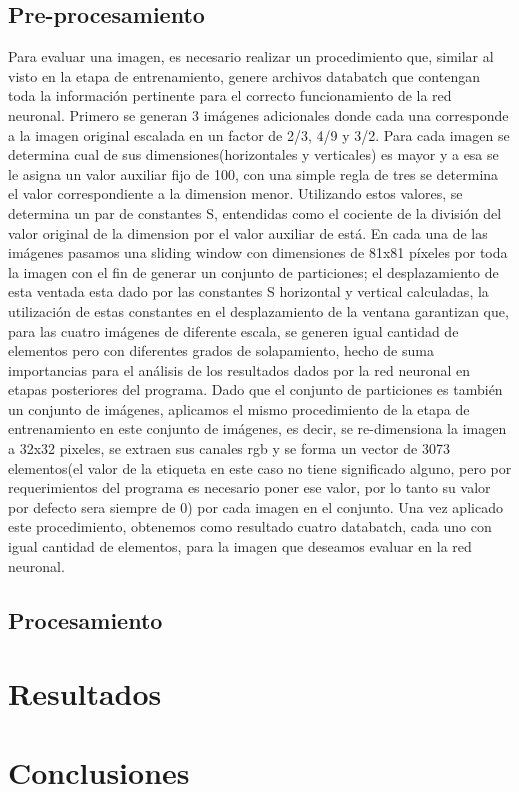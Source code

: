 \documentclass[10pt,twocolumn,letterpaper]{article}
\begin{document}
\subsection{Pre-procesamiento}
Para evaluar una imagen, es necesario realizar un procedimiento que, similar al visto en la etapa de entrenamiento, genere archivos databatch que contengan toda la información pertinente para el correcto funcionamiento de la red neuronal. Primero se generan 3 imágenes adicionales donde cada una corresponde a la imagen original escalada en un factor de 2/3, 4/9 y 3/2. Para cada imagen se determina cual de sus dimensiones(horizontales y verticales) es mayor y a esa se le asigna un valor auxiliar fijo de 100, con una simple regla de tres se determina el valor correspondiente a la dimension menor. Utilizando estos valores, se determina un par de constantes S, entendidas como el cociente de la división del valor original de la dimension por el valor auxiliar de está. En cada una de las imágenes pasamos una sliding window con dimensiones de 81x81 píxeles por toda la imagen con el fin de generar un conjunto de particiones; el desplazamiento de esta ventada esta dado por las constantes S horizontal y vertical calculadas, la utilización de estas constantes en el desplazamiento de la ventana garantizan que, para las cuatro imágenes de diferente escala, se generen igual cantidad de elementos pero con diferentes grados de solapamiento, hecho de suma importancias para el análisis de los resultados dados por la red neuronal en etapas posteriores del programa. Dado que el conjunto de particiones es también un conjunto de imágenes, aplicamos el mismo procedimiento de la etapa de entrenamiento en este conjunto de imágenes, es decir, se re-dimensiona la imagen a 32x32 pixeles, se extraen sus canales rgb y se forma un vector de 3073 elementos(el valor de la etiqueta en este caso no tiene significado alguno, pero por requerimientos del programa es necesario poner ese valor, por lo tanto su valor por defecto sera siempre de 0) por cada imagen en el conjunto. Una vez aplicado este procedimiento, obtenemos como resultado cuatro databatch, cada uno con igual cantidad de elementos, para la imagen que deseamos evaluar en la red neuronal.

\subsection{Procesamiento}




\section{Resultados}

\section{Conclusiones}
\end{document}
